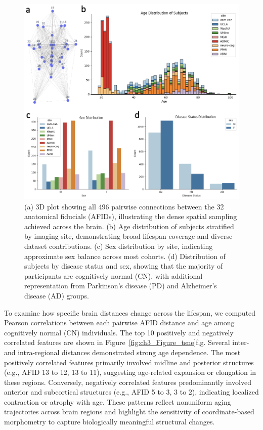 \begin{figure}[hbt!]
    \centering
    \includegraphics[width=1\linewidth]{figs/ch3_Figure_pairwisedata.png}
    \caption{(a) 3D plot showing all 496 pairwise connections between the 32 anatomical fiducials (AFIDs), illustrating the dense spatial sampling achieved across the brain. (b) Age distribution of subjects stratified by imaging site, demonstrating broad lifespan coverage and diverse dataset contributions. (c) Sex distribution by site, indicating approximate sex balance across most cohorts. (d) Distribution of subjects by disease status and sex, showing that the majority of participants are cognitively normal (CN), with additional representation from Parkinson’s disease (PD) and Alzheimer’s disease (AD) groups.
}
    \label{fig:ch3_Figure_pairwisedata}
\end{figure}

To examine how specific brain distances change across the lifespan, we computed Pearson correlations between each pairwise AFID distance and age among cognitively normal (CN) individuals. The top 10 positively and negatively correlated features are shown in Figure~\ref{fig:ch3_Figure_tsne}f,g. Several inter- and intra-regional distances demonstrated strong age dependence. The most positively correlated features primarily involved midline and posterior structures (e.g., AFID 13 to 12, 13 to 11), suggesting age-related expansion or elongation in these regions. Conversely, negatively correlated features predominantly involved anterior and subcortical structures (e.g., AFID 5 to 3, 3 to 2), indicating localized contraction or atrophy with age. These patterns reflect nonuniform aging trajectories across brain regions and highlight the sensitivity of coordinate-based morphometry to capture biologically meaningful structural changes.

